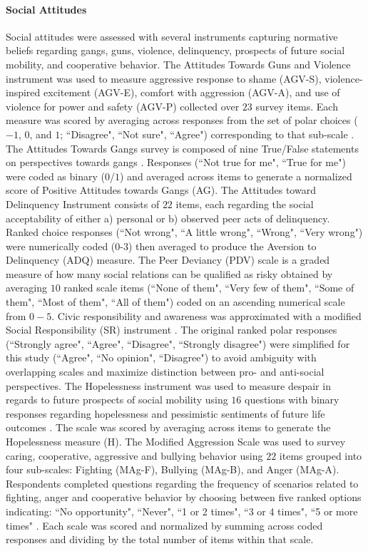 \documentclass[utf8]{article}
\begin{document}
\paragraph{Social Attitudes}
Social attitudes were assessed with several instruments capturing normative beliefs regarding gangs, guns, violence, delinquency, prospects of future social mobility, and cooperative behavior. The Attitudes Towards Guns and Violence instrument was used to measure aggressive response to shame (AGV-S), violence-inspired excitement (AGV-E), comfort with aggression (AGV-A), and use of violence for power and safety (AGV-P) collected over $23$ survey items. Each measure was scored by averaging across responses from the set of polar choices ($-1$, $0$, and $1$; ``Disagree", ``Not sure", ``Agree") corresponding to that sub-scale \citep{shapiro1997development}. The Attitudes Towards Gangs survey is composed of nine True/False statements on perspectives towards gangs \citep{nadel1996cycle}. Responses (``Not true for me", ``True for me") were coded as binary ($0$/$1$) and averaged across items to generate a normalized score of Positive Attitudes towards Gangs (AG). The Attitudes toward Delinquency Instrument consists of $22$ items, each regarding the social acceptability of either a) personal or b) observed peer acts of delinquency. Ranked choice responses (``Not wrong", ``A little wrong", ``Wrong", ``Very wrong") were numerically coded ($0$-$3$) then averaged to produce the Aversion to Delinquency (ADQ) measure. The Peer Deviancy (PDV) scale is a graded measure of how many social relations can be qualified as risky \citep{project2004multisite} obtained by averaging $10$ ranked scale items (``None of them", ``Very few of them", ``Some of them", ``Most of them", ``All of them") coded on an ascending numerical scale from $0-5$. Civic responsibility and awareness was approximated with a modified Social Responsibility (SR) instrument \citep{nedwek1998social}. The original ranked polar responses (``Strongly agree", ``Agree", ``Disagree", ``Strongly disagree") were simplified for this study (``Agree", ``No opinion", ``Disagree") to avoid ambiguity with overlapping scales and maximize distinction between pro- and anti-social perspectives. The Hopelessness instrument was used to measure despair in regards to future prospects of social mobility using $16$ questions with binary responses regarding hopelessness and pessimistic sentiments of future life outcomes \citep{kazdin1983hopelessness}. The scale was scored by averaging across items to generate the Hopelessness measure (H). The Modified Aggression Scale was used to survey caring, cooperative, aggressive and bullying behavior using $22$ items grouped into four sub-scales: Fighting (MAg-F), Bullying (MAg-B), and Anger (MAg-A). Respondents completed questions regarding the frequency of scenarios related to fighting, anger and cooperative behavior by choosing between five ranked options indicating: ``No opportunity", ``Never", ``1 or 2 times", ``3 or 4 times", ``5 or more times" \citep{bosworth1995teen}. Each scale was scored and normalized by summing across coded responses and dividing by the total number of items within that scale. 
\end{document}
